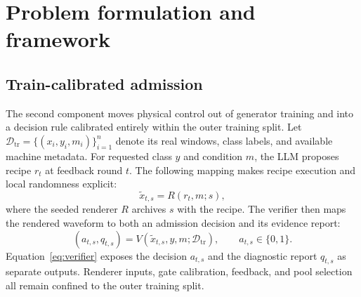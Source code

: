 \documentclass[a4paper,fleqn]{cas-sc}
\begin{document}
\section{Problem formulation and framework}
\label{sec:method}

\subsection{Train-calibrated admission}

The second component moves physical control out of generator training and into
a decision rule calibrated entirely within the outer training split. Let
$\mathcal{D}_{\mathrm{tr}}=\{(x_i,y_i,m_i)\}_{i=1}^{n}$ denote its real
windows, class labels, and available machine metadata. For requested class $y$
and condition $m$, the LLM proposes recipe $r_t$ at feedback round $t$. The
following mapping makes recipe execution and local randomness explicit:
\begin{equation}
  \tilde{x}_{t,s}=R(r_t,m;s),
\end{equation}
where the seeded renderer $R$ archives $s$ with the recipe. The verifier then
maps the rendered waveform to both an admission decision and its evidence
report:
\begin{equation}
 (a_{t,s},q_{t,s})=V(\tilde{x}_{t,s},y,m;\mathcal{D}_{\mathrm{tr}}),
 \qquad a_{t,s}\in\{0,1\}.
 \label{eq:verifier}
\end{equation}
Equation~\eqref{eq:verifier} exposes the decision $a_{t,s}$ and the diagnostic
report $q_{t,s}$ as separate outputs. Renderer inputs, gate calibration,
feedback, and pool selection all remain confined to the outer training split.
\end{document}

